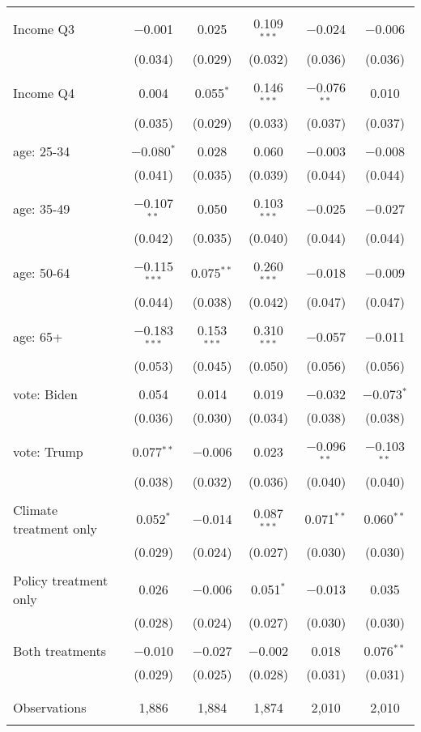 \begin{tabular}{@{\extracolsep{5pt}}lccccc}
  & & & & & \\ 
 Income Q3 & $-$0.001 & 0.025 & 0.109$^{***}$ & $-$0.024 & $-$0.006 \\ 
  & (0.034) & (0.029) & (0.032) & (0.036) & (0.036) \\ 
  & & & & & \\ 
 Income Q4 & 0.004 & 0.055$^{*}$ & 0.146$^{***}$ & $-$0.076$^{**}$ & 0.010 \\ 
  & (0.035) & (0.029) & (0.033) & (0.037) & (0.037) \\ 
  & & & & & \\ 
 age: 25-34 & $-$0.080$^{*}$ & 0.028 & 0.060 & $-$0.003 & $-$0.008 \\ 
  & (0.041) & (0.035) & (0.039) & (0.044) & (0.044) \\ 
  & & & & & \\ 
 age: 35-49 & $-$0.107$^{**}$ & 0.050 & 0.103$^{***}$ & $-$0.025 & $-$0.027 \\ 
  & (0.042) & (0.035) & (0.040) & (0.044) & (0.044) \\ 
  & & & & & \\ 
 age: 50-64 & $-$0.115$^{***}$ & 0.075$^{**}$ & 0.260$^{***}$ & $-$0.018 & $-$0.009 \\ 
  & (0.044) & (0.038) & (0.042) & (0.047) & (0.047) \\ 
  & & & & & \\ 
 age: 65+ & $-$0.183$^{***}$ & 0.153$^{***}$ & 0.310$^{***}$ & $-$0.057 & $-$0.011 \\ 
  & (0.053) & (0.045) & (0.050) & (0.056) & (0.056) \\ 
  & & & & & \\ 
 vote: Biden & 0.054 & 0.014 & 0.019 & $-$0.032 & $-$0.073$^{*}$ \\ 
  & (0.036) & (0.030) & (0.034) & (0.038) & (0.038) \\ 
  & & & & & \\ 
 vote: Trump & 0.077$^{**}$ & $-$0.006 & 0.023 & $-$0.096$^{**}$ & $-$0.103$^{**}$ \\ 
  & (0.038) & (0.032) & (0.036) & (0.040) & (0.040) \\ 
  & & & & & \\ 
 Climate treatment only & 0.052$^{*}$ & $-$0.014 & 0.087$^{***}$ & 0.071$^{**}$ & 0.060$^{**}$ \\ 
  & (0.029) & (0.024) & (0.027) & (0.030) & (0.030) \\ 
  & & & & & \\ 
 Policy treatment only & 0.026 & $-$0.006 & 0.051$^{*}$ & $-$0.013 & 0.035 \\ 
  & (0.028) & (0.024) & (0.027) & (0.030) & (0.030) \\ 
  & & & & & \\ 
 Both treatments & $-$0.010 & $-$0.027 & $-$0.002 & 0.018 & 0.076$^{**}$ \\ 
  & (0.029) & (0.025) & (0.028) & (0.031) & (0.031) \\ 
  & & & & & \\ 
\hline \\[-1.8ex] 

Observations & 1,886 & 1,884 & 1,874 & 2,010 & 2,010 \\ 
\hline 
\hline \\[-1.8ex] 
\end{tabular} 